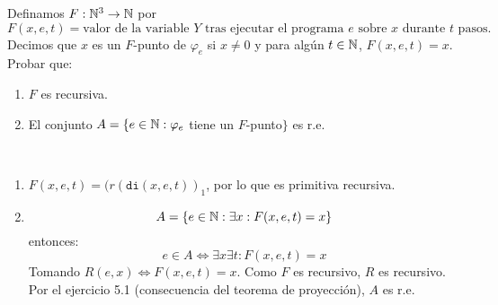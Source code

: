 \documentclass[11pt]{article}
\let \sii \Leftrightarrow
\begin{document}
\begin{ejercicio}{1}
Definamos $F : \mathbb{N}^3\to \mathbb{N}$ por
$$F(x, e, t) = \text{valor de la variable }Y\text{ tras ejecutar el programa }e\text{ sobre }x\text{ durante }t\text{ pasos.}$$
Decimos que $x$ es un $F$-punto de $\varphi_e$ si $x \neq 0$ y para algún $t \in \mathbb{N}$, $F(x, e, t) = x$. Probar que:
\begin{enumerate}
\item $F$ es recursiva.
\item El conjunto $A = \{e \in \mathbb{N} : \varphi_e$ tiene un $F$-punto$\}$ es r.e.
\end{enumerate}
\end{ejercicio}
\begin{solucion}\
\begin{enumerate}
	\item $F(x,e,t)=(r(\texttt{di}(x,e,t))_1$, por lo que es primitiva recursiva.
	\item \[ A = \{ e \in \mathbb{N} : \exists x : F(x,e,t) = x \} \]
entonces:
\[ e \in A \sii \exists x \exists t : F(x,e,t) = x \]
Tomando $R(e,x) \sii F(x,e,t) = x$. Como $F$ es recursivo, $R$ es recursivo. Por el ejercicio 5.1 (consecuencia del teorema de proyección), $A$ es r.e.
\end{enumerate}
\end{solucion}

\newpage
\end{document}
